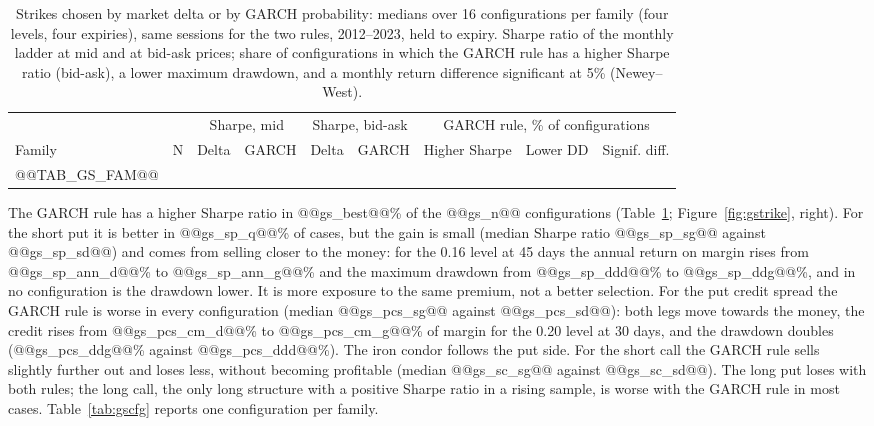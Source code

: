 \documentclass[11pt,a4paper]{article}
\begin{document}
\begin{table}[ht]\centering\footnotesize
\caption{Strikes chosen by market delta or by GARCH probability: medians over 16 configurations per family (four levels, four expiries), same sessions for the two rules, 2012--2023, held to expiry. Sharpe ratio of the monthly ladder at mid and at bid-ask prices; share of configurations in which the GARCH rule has a higher Sharpe ratio (bid-ask), a lower maximum drawdown, and a monthly return difference significant at 5\% (Newey--West).}\label{tab:gsfam}
\begin{tabular}{lrrrrrrrr}\toprule
 & & \multicolumn{2}{c}{Sharpe, mid} & \multicolumn{2}{c}{Sharpe, bid-ask} & \multicolumn{3}{c}{GARCH rule, \% of configurations} \\ \cmidrule(lr){3-4}\cmidrule(lr){5-6}\cmidrule(lr){7-9}
Family & N & Delta & GARCH & Delta & GARCH & Higher Sharpe & Lower DD & Signif. diff. \\ \midrule
@@TAB_GS_FAM@@
\bottomrule\end{tabular}\end{table}

The GARCH rule has a higher Sharpe ratio in @@gs_best@@\% of the @@gs_n@@ configurations (Table~\ref{tab:gsfam}; Figure~\ref{fig:gstrike}, right). For the short put it is better in @@gs_sp_q@@\% of cases, but the gain is small (median Sharpe ratio @@gs_sp_sg@@ against @@gs_sp_sd@@) and comes from selling closer to the money: for the 0.16 level at 45 days the annual return on margin rises from @@gs_sp_ann_d@@\% to @@gs_sp_ann_g@@\% and the maximum drawdown from @@gs_sp_ddd@@\% to @@gs_sp_ddg@@\%, and in no configuration is the drawdown lower. It is more exposure to the same premium, not a better selection. For the put credit spread the GARCH rule is worse in every configuration (median @@gs_pcs_sg@@ against @@gs_pcs_sd@@): both legs move towards the money, the credit rises from @@gs_pcs_cm_d@@\% to @@gs_pcs_cm_g@@\% of margin for the 0.20 level at 30 days, and the drawdown doubles (@@gs_pcs_ddg@@\% against @@gs_pcs_ddd@@\%). The iron condor follows the put side. For the short call the GARCH rule sells slightly further out and loses less, without becoming profitable (median @@gs_sc_sg@@ against @@gs_sc_sd@@). The long put loses with both rules; the long call, the only long structure with a positive Sharpe ratio in a rising sample, is worse with the GARCH rule in most cases. Table~\ref{tab:gscfg} reports one configuration per family.
\end{document}
